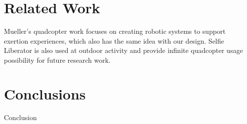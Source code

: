 \documentclass{sig-alternate-ipsn13}
\begin{document}
\section{Related Work}
Mueller's quadcopter work\cite{cite1} focuses on creating robotic systems to support exertion experiences, which also has the same idea with our design. Selfie Liberator is also used at outdoor activity and provide infinite quadcopter usage possibility for future research work.



\section{Conclusions}
Conclusion


%

%
%


\end{document}
